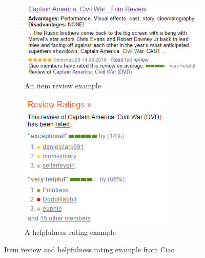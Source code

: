 \documentclass[master,english,final]{kaist-ucs}
\begin{document}
\begin{figure}[b]
    \centering
    \begin{subfigure}[b]{0.6\textwidth}
        \centering
        \includegraphics[width=\linewidth]{figure/item_review_example}
        \caption{An item review example}
        \label{item_review_example}
    \end{subfigure}
    \begin{subfigure}[b]{0.35\textwidth}
        \centering
        \includegraphics[width=\linewidth]{figure/helpfulness_rating_example}
        \caption{A helpfulness rating example}
        \label{helpfulness_rating_example}
    \end{subfigure}
    \caption{Item review and helpfulness rating example from Ciao}
    \label{real_world_example}
\end{figure}
\end{document}
